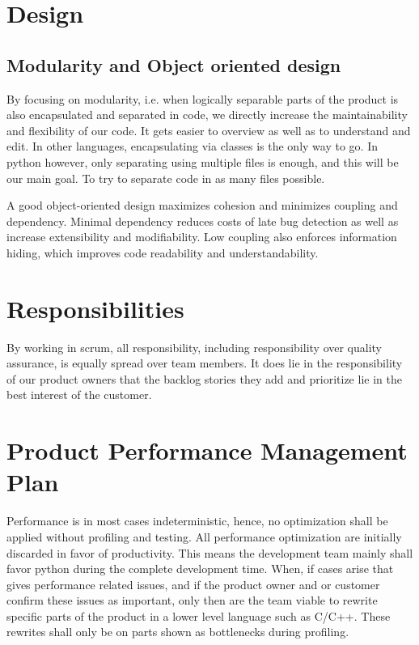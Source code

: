\documentclass{article}
\begin{document}
\section{Design}

\subsection{Modularity and Object oriented design}
By focusing on modularity, i.e. when logically separable parts of the product is also encapsulated and separated in code, we directly increase the maintainability and flexibility of our code.
It gets easier to overview as well as to understand and edit.
In other languages, encapsulating via classes is the only way to go.
In python however, only separating using multiple files is enough, and this will be our main goal.
To try to separate code in as many files possible.

A good object-oriented design maximizes cohesion and minimizes coupling and dependency.
Minimal dependency reduces costs of late bug detection as well as increase extensibility and modifiability.
Low coupling also enforces information hiding, which improves code readability and understandability.

\section{Responsibilities}
By working in scrum, all responsibility, including responsibility over quality assurance, is equally spread over team members.
It does lie in the responsibility of our product owners that the backlog stories they add and prioritize lie in the best interest of the customer.

\section{Product Performance Management Plan}
Performance is in most cases indeterministic, hence, no optimization shall be applied without profiling and testing. 
All performance optimization are initially discarded in favor of productivity.
This means the development team mainly shall favor python during the complete development time.
When, if cases arise that gives performance related issues, and if the product owner and or customer confirm these issues as important, only then are the team viable to rewrite specific parts of the product in a lower level language such as C/C++.
These rewrites shall only be on parts shown as bottlenecks during profiling.
\end{document}
